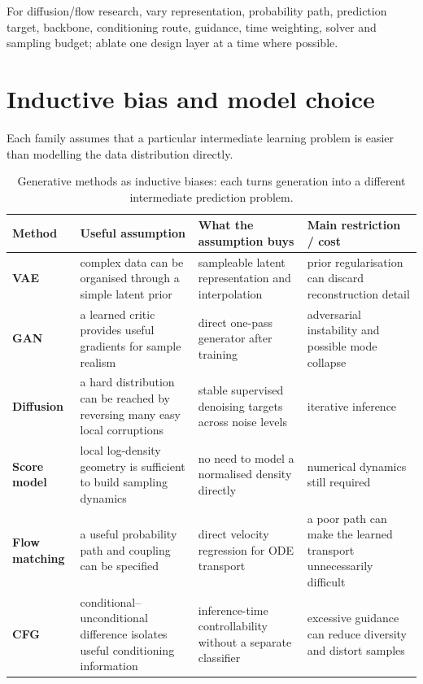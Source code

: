 \begin{calloutdegreeofexperiment}
For diffusion/flow research, vary representation, probability path, prediction target, backbone, conditioning route, guidance, time weighting, solver and sampling budget; ablate one design layer at a time where possible.
\end{calloutdegreeofexperiment}

\section{Inductive bias and model choice}

Each family assumes that a particular intermediate learning problem is easier than modelling the data distribution directly.

\begin{table}[H]
\centering
\small
\begin{tabularx}{\linewidth}{>{\bfseries}l X X X}
\toprule
Method & Useful assumption & What the assumption buys & Main restriction / cost \\
\midrule
VAE & complex data can be organised through a simple latent prior & sampleable latent representation and interpolation & prior regularisation can discard reconstruction detail \\
GAN & a learned critic provides useful gradients for sample realism & direct one-pass generator after training & adversarial instability and possible mode collapse \\
Diffusion & a hard distribution can be reached by reversing many easy local corruptions & stable supervised denoising targets across noise levels & iterative inference \\
Score model & local log-density geometry is sufficient to build sampling dynamics & no need to model a normalised density directly & numerical dynamics still required \\
Flow matching & a useful probability path and coupling can be specified & direct velocity regression for ODE transport & a poor path can make the learned transport unnecessarily difficult \\
CFG & conditional--unconditional difference isolates useful conditioning information & inference-time controllability without a separate classifier & excessive guidance can reduce diversity and distort samples \\
\bottomrule
\end{tabularx}
\caption{Generative methods as inductive biases: each turns generation into a different intermediate prediction problem.}
\label{tab:generative-inductive-bias}
\end{table}

